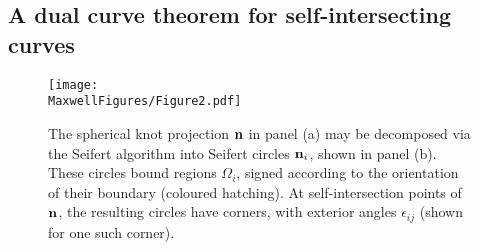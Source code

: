     \subsection{A dual curve theorem for self-intersecting curves}
    \label{subsec:GaussBonnetSelfIntersecting}
    \begin{figure}
        \centering
        \texttt{[image: \\MaxwellFigures/Figure2.pdf]}
        \caption{The spherical knot projection $\bf n$ in panel (a) may be decomposed via the Seifert algorithm into Seifert circles ${\bf n}_i$, shown in panel (b). These circles bound regions $\Omega_i$, signed according to the orientation of their boundary (coloured hatching). At self-intersection points of $\bf n$, the resulting circles have corners, with exterior angles $\epsilon_{ij}$ (shown for one such corner).}
        \label{fig:GaussBonnet} 
    \end{figure}

